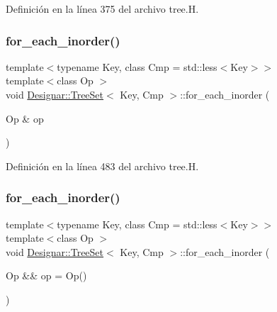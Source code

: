 Definición en la línea 375 del archivo tree.\+H.

\mbox{\label{class_designar_1_1_tree_set_af57ef3d8bb57487085079df5b5da4139}} 
\subsubsection{\texorpdfstring{for\+\_\+each\+\_\+inorder()}{for\_each\_inorder()}\hspace{0.1cm}{\footnotesize\ttfamily [1/2]}}
{\footnotesize\ttfamily template$<$typename Key, class Cmp = std\+::less$<$\+Key$>$$>$ \\
template$<$class Op $>$ \\
void \hyperlink{class_designar_1_1_tree_set}{Designar\+::\+Tree\+Set}$<$ Key, Cmp $>$\+::for\+\_\+each\+\_\+inorder (\begin{DoxyParamCaption}\item[{Op \&}]{op }\end{DoxyParamCaption})\hspace{0.3cm}{\ttfamily [inline]}}



Definición en la línea 483 del archivo tree.\+H.

\mbox{\label{class_designar_1_1_tree_set_a0b3e506271289cc4e1e1fa3ce3ae9113}} 
\subsubsection{\texorpdfstring{for\+\_\+each\+\_\+inorder()}{for\_each\_inorder()}\hspace{0.1cm}{\footnotesize\ttfamily [2/2]}}
{\footnotesize\ttfamily template$<$typename Key, class Cmp = std\+::less$<$\+Key$>$$>$ \\
template$<$class Op $>$ \\
void \hyperlink{class_designar_1_1_tree_set}{Designar\+::\+Tree\+Set}$<$ Key, Cmp $>$\+::for\+\_\+each\+\_\+inorder (\begin{DoxyParamCaption}\item[{Op \&\&}]{op = {\ttfamily Op()} }\end{DoxyParamCaption})\hspace{0.3cm}{\ttfamily [inline]}}



